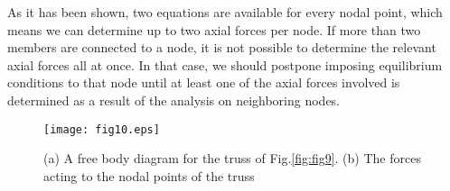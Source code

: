 ﻿\documentclass[10pt,a4j]{article}
\begin{document}
As it has been shown, two equations are available for every nodal point, which means we can determine up to two axial forces per node. If more than two members are connected to a node, it is not possible to determine the relevant axial forces all at once. In that case, we should postpone imposing equilibrium conditions to that node until at least one of the axial forces involved is determined as a result of the analysis on neighboring nodes.
\begin{figure}[h]
	\begin{center}
	\texttt{[image: fig10.eps]} 
	\end{center}
	\caption{(a) A free body diagram for the truss of Fig.\ref{fig:fig9}. 
	(b) The forces acting to the nodal points of the truss}
	\label{fig:fig10}
\end{figure}
\end{document}
